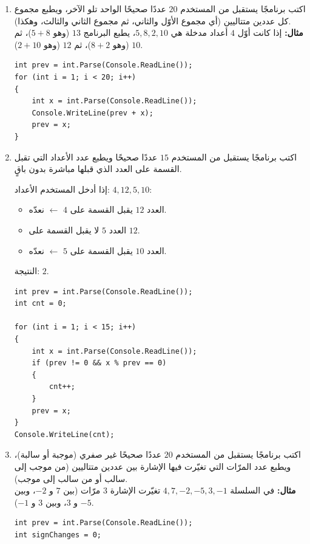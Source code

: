 \documentclass[14pt]{extarticle}
\begin{document}
\begin{enumerate}[itemsep=2em]
\item اكتب برنامجًا يستقبل من المستخدم $20$ عددًا صحيحًا الواحد تلو الآخر، ويطبع مجموع كل عددين متتاليين (أي مجموع الأوّل والثاني، ثم مجموع الثاني والثالث، وهكذا). \\
\textbf{مثال:} إذا كانت أوّل $4$ أعداد مدخلة هي $5, 8, 2, 10$، يطبع البرنامج $13$ (وهو $5 + 8$)، ثم $10$ (وهو $8 + 2$)، ثم $12$ (وهو $2 + 10$).
\ifwithsols
\begin{boxSolution}
\begin{english}
\begin{verbatim}
int prev = int.Parse(Console.ReadLine());
for (int i = 1; i < 20; i++)
{
    int x = int.Parse(Console.ReadLine());
    Console.WriteLine(prev + x);
    prev = x;
}
\end{verbatim}
\end{english}
\end{boxSolution}
\fi
\filbreak

\item اكتب برنامجًا يستقبل من المستخدم $15$ عددًا صحيحًا ويطبع عدد الأعداد التي تقبل القسمة على العدد الذي قبلها مباشرة بدون باقٍ.
\ifdetailed
\begin{boxExample}
إذا أدخل المستخدم الأعداد: $4, 12, 5, 10$:
\begin{itemize}[nosep]
    \item العدد $12$ يقبل القسمة على $4$ $\leftarrow$ نعدّه.
    \item العدد $5$ لا يقبل القسمة على $12$.
    \item العدد $10$ يقبل القسمة على $5$ $\leftarrow$ نعدّه.
\end{itemize}
النتيجة: $2$.
\end{boxExample}
\fi
\ifwithsols
\begin{boxSolution}
\begin{english}
\begin{verbatim}
int prev = int.Parse(Console.ReadLine());
int cnt = 0;

for (int i = 1; i < 15; i++)
{
    int x = int.Parse(Console.ReadLine());
    if (prev != 0 && x % prev == 0)
    {
        cnt++;
    }
    prev = x;
}
Console.WriteLine(cnt);
\end{verbatim}
\end{english}
\end{boxSolution}
\fi
\filbreak

\item اكتب برنامجًا يستقبل من المستخدم $20$ عددًا صحيحًا غير صفري (موجبة أو سالبة)، ويطبع عدد المرّات التي تغيّرت فيها الإشارة بين عددين متتاليين (من موجب إلى سالب أو من سالب إلى موجب). \\
\textbf{مثال:} في السلسلة $4, 7, -2, -5, 3, -1$ تغيّرت الإشارة $3$ مرّات (بين $7$ و $-2$، وبين $-5$ و $3$، وبين $3$ و $-1$).
\ifwithsols
\begin{boxSolution}
\begin{english}
\begin{verbatim}
int prev = int.Parse(Console.ReadLine());
int signChanges = 0;


\end{verbatim}
\end{english}
\end{boxSolution}
\end{enumerate}
\end{document}
